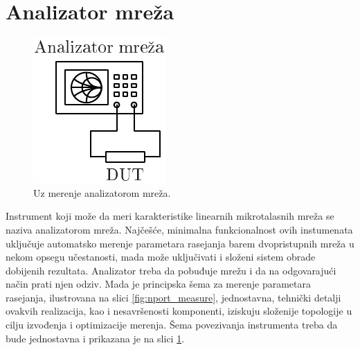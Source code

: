 \documentclass[a4paper, 12pt, diplomski]{etf}
\begin{document}
\section{Analizator mreža}
\begin{figure}[ht!]
    \centering
    \includegraphics{fig/na.pdf}
    \caption{Uz merenje analizatorom mreža.}
    \label{fig:na}
\end{figure}
Instrument koji može da meri karakteristike linearnih
mikrotalasnih mreža se naziva analizatorom 
mreža. Najčešće, minimalna funkcionalnost ovih instumenata
uključuje automatsko merenje parametara rasejanja barem 
dvopristupnih mreža u nekom opsegu učestanosti,
mada može uključivati i složeni sistem obrade 
dobijenih rezultata. 
Analizator treba da pobuđuje mrežu i da na odgovarajući  način prati njen odziv. Mada je 
principska šema za merenje parametara rasejanja,
ilustrovana na slici \ref{fig:nport_measure},
jednostavna, tehnički
detalji ovakvih realizacija, kao i nesavršenosti
komponenti, iziskuju 
složenije
topologije u cilju izvođenja i optimizacije merenja. Šema
povezivanja instrumenta treba da bude jednostavna i prikazana je na slici 
\ref{fig:na}.
\end{document}
